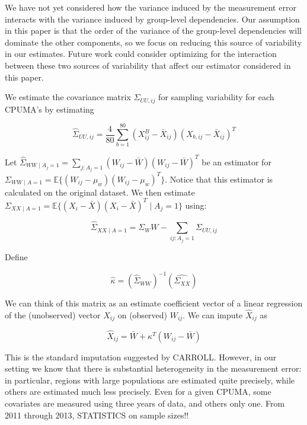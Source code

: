 \documentclass[12pt]{article}
\begin{document}
We have not yet considered how the variance induced by the measurement error interacts with the variance induced by group-level dependencies. Our assumption in this paper is that the order of the variance of the group-level dependencies will dominate the other components, so we focus on reducing this source of variability in our estimates. Future work could consider optimizing for the interaction between these two sources of variability that affect our estimator considered in this paper.


We estimate the covariance matrix $\Sigma_{UU, ij}$ for sampling variability for each CPUMA's by estimating

$$
\hat{\Sigma}_{UU, ij} = \frac{4}{80}\sum_{b=1}^{80}(X_{ij}^B - \bar{X}_{ij})(X_{b, ij} - \bar{X}_{ij})^T
$$

Let $\hat{\Sigma}_{WW \mid A_j = 1} = \sum_{j: A_j = 1} (W_{ij} - \bar{W})(W_{ij} - \bar{W})^T$ be an estimator for $\Sigma_{WW \mid A = 1} = \mathbb{E}\{(W_{ij} - \mu_w)(W_{ij} - \mu_w)^T\}$. Notice that this estimator is calculated on the original dataset. We then estimate $\Sigma_{XX \mid A = 1} = \mathbb{E}\{(X_i - \bar{X})(X_i - \bar{X})^T \mid A_j = 1\}$ using:

$$
\hat{\Sigma}_{XX \mid A = 1} = \Sigma_WW - \sum_{ij: A_j = 1} \Sigma_{UU, ij}
$$

Define

$$
\hat{\kappa} = (\hat{\Sigma}_{WW})^{-1}(\hat{\Sigma_{XX}})
$$

We can think of this matrix as an estimate coefficient vector of a linear regression of the (unobserved) vector $X_{ij}$ on (observed) $W_{ij}$. We can impute $\hat{X}_{ij}$ as

$$
\hat{X}_{ij} = \bar{W} + \kappa^T(W_{ij} - \bar{W})
$$

This is the standard imputation suggested by CARROLL. However, in our setting we know that there is substantial heterogeneity in the measurement error: in particular, regions with large populations are estimated quite precisely, while others are estimated much less precisely. Even for a given CPUMA, some covariates are measured using three years of data, and others only one. From 2011 through 2013, STATISTICS on sample sizes!!
\end{document}
